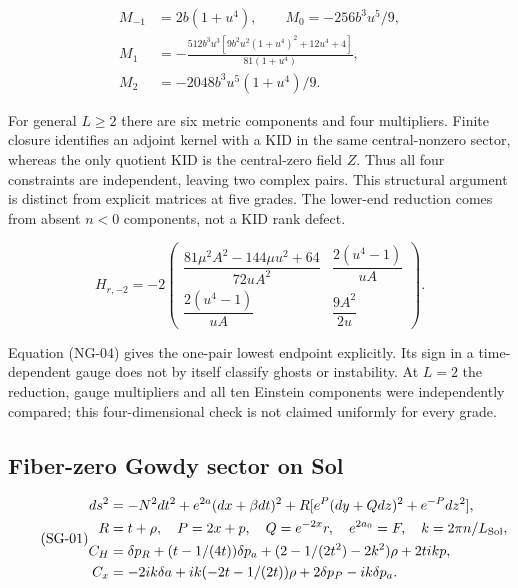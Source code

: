 \begin{equation}\tag{NG-03}\label{eq:NG-03}
\begin{aligned}
M_{-1}&=2b(1+u^4),\qquad M_0=-256b^3u^5/9,\\
M_1&=-\frac{512b^3u^3[9b^2u^2(1+u^4)^2+12u^4+4]}{81(1+u^4)},\\
M_2&=-2048b^3u^5(1+u^4)/9.
\end{aligned}
\end{equation}

For general $L\ge2$ there are six metric components and four multipliers. Finite closure identifies an adjoint kernel with a KID in the same central-nonzero sector, whereas the only quotient KID is the central-zero field $Z$. Thus all four constraints are independent, leaving two complex pairs. This structural argument is distinct from explicit matrices at five grades. The lower-end reduction comes from absent $n<0$ components, not a KID rank defect.

\begin{equation}\tag{NG-04}\label{eq:NG-04}
H_{r,-2}=-2\begin{pmatrix}
\dfrac{81\mu^2A^2-144\mu u^2+64}{72uA^2}&\dfrac{2(u^4-1)}{uA}\\[4pt]
\dfrac{2(u^4-1)}{uA}&\dfrac{9A^2}{2u}
\end{pmatrix}.
\end{equation}

Equation (NG-04) gives the one-pair lowest endpoint explicitly. Its sign in a time-dependent gauge does not by itself classify ghosts or instability. At $L=2$ the reduction, gauge multipliers and all ten Einstein components were independently compared; this four-dimensional check is not claimed uniformly for every grade.

\subsection{Fiber-zero Gowdy sector on Sol}

\begin{equation}\tag{SG-01}\label{eq:SG-01}
\begin{aligned}
ds^2&=-N^2dt^2+e^{2a}(dx+\beta dt)^2
+R[e^P(dy+Qdz)^2+e^{-P}dz^2],\\
R&=t+\rho,\quad P=2x+p,\quad Q=e^{-2x}r,\quad e^{2a_0}=F,\quad k=2\pi n/L_{\rm Sol},\\
C_H&=\delta p_R+(t-1/(4t))\delta p_a
+(2-1/(2t^2)-2k^2)\rho+2tikp,\\
C_x&=-2ik\delta a+ik(-2t-1/(2t))\rho+2\delta p_P-ik\delta p_a.
\end{aligned}
\end{equation}

